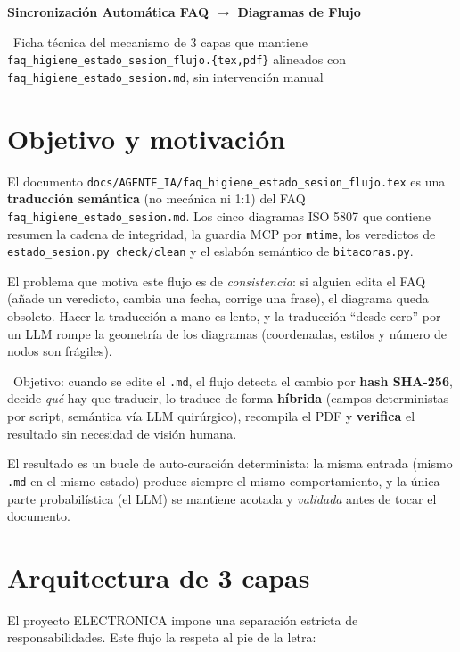 \documentclass[11pt,a4paper]{article}
\newcommand{\iconoBanda}{sync-alt}
\newcommand{\bandaTitulo}[3][fondoOscuro]{%
  \begin{tcolorbox}[
    enhanced,
    colback=#1, colframe=#1,
    boxrule=0pt, arc=8pt, outer arc=8pt,
    width=\linewidth,
    top=18pt, bottom=6pt, left=14pt, right=14pt,
    borderline south={3.5pt}{0pt}{cyanNeon},
  ]
    \begin{minipage}[c]{0.07\linewidth}
      \centering
      \textcolor{cyanNeon}{\fontsize{30}{30}\selectfont\faIcon{\iconoBanda}}
    \end{minipage}%
    \hspace{8pt}%
    \begin{minipage}[c]{0.88\linewidth}
      {\fontsize{20}{24}\selectfont\bfseries\color{white}#2}\par\vspace{5pt}%
      \textcolor{cyanNeon!80!white}{\small\faIcon{angle-right}~#3}%
    \end{minipage}
    \vspace{4pt}
  \end{tcolorbox}%
  \vspace{8pt}%
}
\begin{document}
\bandaTitulo{Sincronización Automática FAQ $\rightarrow$ Diagramas de Flujo}{Ficha técnica del mecanismo de 3 capas que mantiene \texttt{faq\_higiene\_estado\_sesion\_flujo.\{tex,pdf\}} alineados con \texttt{faq\_higiene\_estado\_sesion.md}, sin intervención manual}

\section{Objetivo y motivación}

El documento \texttt{docs/AGENTE\_IA/faq\_higiene\_estado\_sesion\_flujo.tex} es una
\textbf{traducción semántica} (no mecánica ni 1:1) del FAQ
\texttt{faq\_higiene\_estado\_sesion.md}. Los cinco diagramas ISO 5807 que contiene
resumen la cadena de integridad, la guardia MCP por \texttt{mtime}, los veredictos de
\texttt{estado\_sesion.py check/clean} y el eslabón semántico de \texttt{bitacoras.py}.

El problema que motiva este flujo es de \emph{consistencia}: si alguien edita el FAQ
(añade un veredicto, cambia una fecha, corrige una frase), el diagrama queda obsoleto.
Hacer la traducción a mano es lento, y la traducción ``desde cero'' por un LLM rompe la
geometría de los diagramas (coordenadas, estilos y número de nodos son frágiles).

\begin{tcolorbox}[cajaConcepto]
~Objetivo: cuando se edite el \texttt{.md}, el flujo detecta el cambio
por \textbf{hash SHA-256}, decide \emph{qué} hay que traducir, lo traduce de forma
\textbf{híbrida} (campos deterministas por script, semántica vía LLM quirúrgico),
recompila el PDF y \textbf{verifica} el resultado sin necesidad de visión humana.
\end{tcolorbox}

El resultado es un bucle de auto-curación determinista: la misma entrada (mismo \texttt{.md}
en el mismo estado) produce siempre el mismo comportamiento, y la única parte probabilística
(el LLM) se mantiene acotada y \emph{validada} antes de tocar el documento.

\section{Arquitectura de 3 capas}

El proyecto ELECTRONICA impone una separación estricta de responsabilidades. Este flujo la
respeta al pie de la letra:
\end{document}
